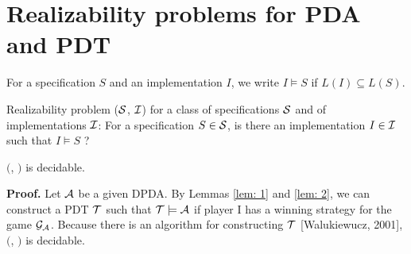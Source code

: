 \section{Realizability problems for PDA and PDT}

For a specification $S$ and an implementation $I$,
we write $I \models S$ if $L(I) \subseteq L(S)$.

\begin{definition}
Realizability problem \Real (${\cal S}$, ${\cal I}$) for a class of specifications ${\cal S}$ and of implementations ${\cal I}$: For a specification $S\in{\cal S}$, is there an implementation $I\in{\cal I}$ such that $I \models S$ ?
\end{definition}

\begin{theorem}\label{the: DPDA}
\Real $($\DPDA, \PDT$)$ is decidable.
\end{theorem}
{\bf Proof.}\quad
Let ${\cal A}$ be a given DPDA.
By Lemmas \ref{lem: 1} and \ref{lem: 2},
we can construct a PDT ${\cal T}$ such that ${\cal T}\models{\cal A}$ if player I has a winning strategy for the game ${\cal G}_{\cal A}$.
Because there is an algorithm for constructing ${\cal T}$ [Walukiewucz, 2001], \Real $($\DPDA, \PDT$)$ is decidable.

